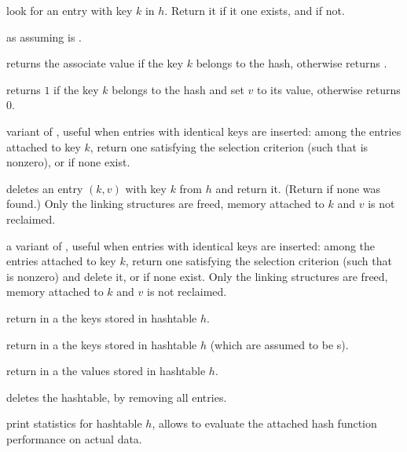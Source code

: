  look for an entry
with key $k$ in $h$. Return it if it one exists, and  if not.

 as
 assuming  is .

returns the associate value if the key $k$ belongs to the hash,
otherwise returns .

returns $1$ if the key $k$ belongs to the hash and set $v$ to its value,
otherwise returns 0.

 variant of , useful when entries
with identical keys are inserted: among the entries attached to
key $k$, return one satisfying the selection criterion (such that
 is nonzero), or  if none exist.

 deletes an entry $(k,v)$
with key $k$ from $h$ and return it. (Return  if none was found.)
Only the linking structures are freed, memory attached to $k$ and $v$
is not reclaimed.

a variant of , useful when entries with identical keys are
inserted: among the entries attached to key $k$, return one satisfying the
selection criterion (such that  is nonzero) and delete it,
or  if none exist. Only the linking structures are freed, memory
attached to $k$ and $v$ is not reclaimed.

 return in a  the keys
stored in hashtable $h$.

 return in a  the keys
stored in hashtable $h$ (which are assumed to be s).

 return in a 
the values stored in hashtable $h$.

 deletes the hashtable, by removing all
entries.

 print statistics for hashtable $h$, allows
to evaluate the attached hash function performance on actual data.


